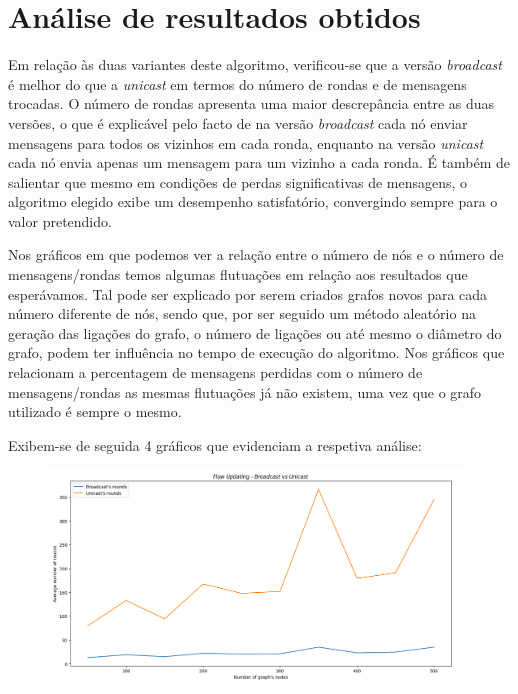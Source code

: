 \documentclass[a4paper]{report}
\begin{document}
{\let\clearpage\relax \chapter{Análise de resultados obtidos} \label{ch:Analysis of results}}
\large{
	Em relação às duas variantes deste algoritmo, verificou-se que a versão \textit{broadcast} é melhor do que a \textit{unicast} em termos do número de rondas e de mensagens trocadas.
	O número de rondas apresenta uma maior descrepância entre as duas versões, o que é explicável pelo facto de na versão \textit{broadcast} cada nó enviar mensagens para todos os vizinhos em cada ronda, 
	enquanto na versão \textit{unicast} cada nó envia apenas um mensagem para um vizinho a cada ronda.	
	É também de salientar que mesmo em condições de perdas significativas de mensagens, o algoritmo elegido exibe um desempenho satisfatório, convergindo sempre para o valor pretendido.

	Nos gráficos em que podemos ver a relação entre o número de nós e o número de mensagens/rondas temos algumas flutuações em relação aos resultados que esperávamos.
	Tal pode ser explicado por serem criados grafos novos para cada número diferente de nós, sendo que, por ser seguido um método aleatório na geração das ligações do grafo, 
	o número de ligações ou até mesmo o diâmetro do grafo, podem ter influência no tempo de execução do algoritmo.
	Nos gráficos que relacionam a percentagem de mensagens perdidas com o número de mensagens/rondas as mesmas flutuações já não existem, uma vez que o grafo utilizado é sempre o mesmo.

	Exibem-se de seguida 4 gráficos que evidenciam a respetiva análise:
	\begin{figure}[H]
		\centering
		\includegraphics[width=0.98\textwidth]{Images/Plot1.png}
		\label{fig:1}
	\end{figure}
	
}
\end{document}
